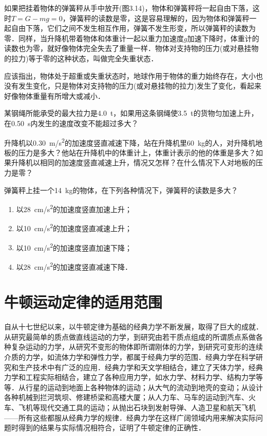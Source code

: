 \begin{Test}
如果把挂着物体的弹簧秤从手中放开(图3.14)，物体和弹簧秤将一起自由下落，这时$T=G-mg=0$，弹簧秤的读数是零，这是容易理解的，因为物体和弹簧秤一起自由下落，它们之间不发生相互作用，弹簧不发生形变，所以弹簧秤的读数为零．同样，当升降机带着物体和体重计一起以重力加速度$g$加速下降时，体重计的读数也为零，就好像物体完全失去了重量一样．物体对支持物的压力(或对悬挂物的拉力)等于零的这种状态，叫做完全失重状态．

应该指出，物体处于超重或失重状态时，地球作用于物体的重力始终存在，大小也没有发生变化，只是物体对支持物的压力(或对悬挂物的拉力)发生了变化，看起来好像物体重量有所增大或减小．

\begin{Exercise}
	\begin{QsNum}
		\item 某钢绳所能承受的最大拉力是\SI{4.0}{t}，如果用这条钢绳使\SI{3.5}{t}的货物匀加速上升，在\SI{0.50}{s}内发生的速度改变不能超过多大？
		\item 升降机以\SI{0.30}{m/s^2}的加速度竖直减速下降，站在升降机里\SI{60}{kg}的人，对升降机地板的压力是多大？他站在升降机中的体重计上，体重计表示的他的体重是多大？如果升降机以相同的加速度竖直减速上升，情况又怎样？在什么情况下人对地板的压力是零？
		\item 弹簧秤上挂一个\SI{14}{kg}的物体，在下列各种情况下，弹簧秤的读数是多大？
		\begin{enumerate}
			\item 以\SI{28}{cm/s^2}的加速度竖直加速上升；
			\item 以\SI{10}{cm/s^2}的加速度竖直减速上升；
			\item 以\SI{10}{cm/s^2}的加速度竖直加速下降；
			\item 以\SI{28}{cm/s^2}的加速度竖直减速下降．
		\end{enumerate}
	\end{QsNum}
\end{Exercise}





\section{牛顿运动定律的适用范围}
自从十七世纪以来，以牛顿定律为基础的经典力学不断发展，取得了巨大的成就．从研究最简单的质点做直线运动的力学，到研究由若干质点组成的所谓质点系做各种复杂运动的力学，从研究不变形的物体即所谓刚体的力学，到研究可变形的连续介质的力学，如流体力学和弹性力学，都属于经典力学的范围．经典力学在科学研究和生产技术中有广泛的应用．经典力学和天文学相结合，建立了天体力学，经典力学和工程实际相结合，建立了各种应用力学，如水力学、材料力学、结构力学等等．从行星的运动到地面上各种物体的运动；从大气的流动到地壳的变动；从设计各种机械到拦河筑坝、修建桥梁和高楼大厦；从人力车、马车的运动到汽车、火车、飞机等现代交通工具的运动；从抛出石块到发射导弹、人造卫星和航天飞机——所有这些都服从经典力学的规律．经典力学在这样广阔领域内用来解决实际问题时得到的结果与实际情况相符合，证明了牛顿定律的正确性．


\end{Test}
